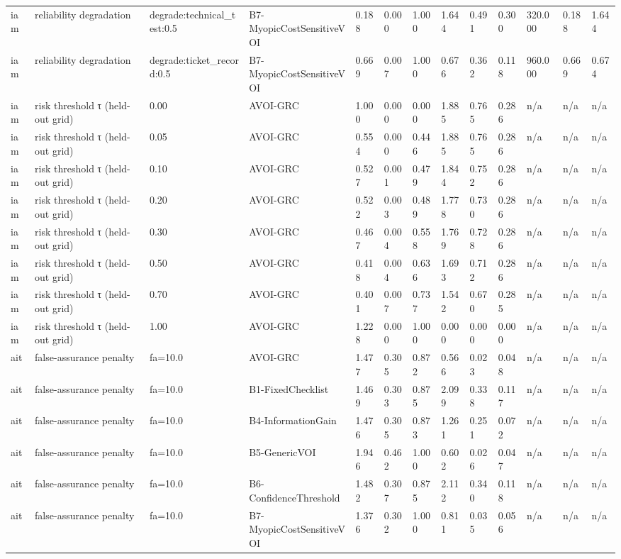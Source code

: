 \begin{table}[!ht]
{\begin{tabular}{lllllllllllll}
iam & reliability degradation & degrade:technical\_test:0.5 & B7-MyopicCostSensitiveVOI & 0.188 & 0.000 & 1.000 & 1.644 & 0.491 & 0.300 & 320.000 & 0.188 & 1.644 \\
iam & reliability degradation & degrade:ticket\_record:0.5 & B7-MyopicCostSensitiveVOI & 0.669 & 0.007 & 1.000 & 0.676 & 0.362 & 0.118 & 960.000 & 0.669 & 0.674 \\
iam & risk threshold τ (held-out grid) & 0.00 & AVOI-GRC & 1.000 & 0.000 & 0.000 & 1.885 & 0.765 & 0.286 & n/a & n/a & n/a \\
iam & risk threshold τ (held-out grid) & 0.05 & AVOI-GRC & 0.554 & 0.000 & 0.446 & 1.885 & 0.765 & 0.286 & n/a & n/a & n/a \\
iam & risk threshold τ (held-out grid) & 0.10 & AVOI-GRC & 0.527 & 0.001 & 0.479 & 1.844 & 0.752 & 0.286 & n/a & n/a & n/a \\
iam & risk threshold τ (held-out grid) & 0.20 & AVOI-GRC & 0.522 & 0.003 & 0.489 & 1.778 & 0.730 & 0.286 & n/a & n/a & n/a \\
iam & risk threshold τ (held-out grid) & 0.30 & AVOI-GRC & 0.467 & 0.004 & 0.558 & 1.769 & 0.728 & 0.286 & n/a & n/a & n/a \\
iam & risk threshold τ (held-out grid) & 0.50 & AVOI-GRC & 0.418 & 0.004 & 0.636 & 1.693 & 0.712 & 0.286 & n/a & n/a & n/a \\
iam & risk threshold τ (held-out grid) & 0.70 & AVOI-GRC & 0.401 & 0.007 & 0.737 & 1.542 & 0.670 & 0.285 & n/a & n/a & n/a \\
iam & risk threshold τ (held-out grid) & 1.00 & AVOI-GRC & 1.228 & 0.000 & 1.000 & 0.000 & 0.000 & 0.000 & n/a & n/a & n/a \\
ait & false-assurance penalty & fa=10.0 & AVOI-GRC & 1.477 & 0.305 & 0.872 & 0.566 & 0.023 & 0.048 & n/a & n/a & n/a \\
ait & false-assurance penalty & fa=10.0 & B1-FixedChecklist & 1.469 & 0.303 & 0.875 & 2.099 & 0.338 & 0.117 & n/a & n/a & n/a \\
ait & false-assurance penalty & fa=10.0 & B4-InformationGain & 1.476 & 0.305 & 0.873 & 1.261 & 0.251 & 0.072 & n/a & n/a & n/a \\
ait & false-assurance penalty & fa=10.0 & B5-GenericVOI & 1.946 & 0.462 & 1.000 & 0.602 & 0.026 & 0.047 & n/a & n/a & n/a \\
ait & false-assurance penalty & fa=10.0 & B6-ConfidenceThreshold & 1.482 & 0.307 & 0.875 & 2.112 & 0.340 & 0.118 & n/a & n/a & n/a \\
ait & false-assurance penalty & fa=10.0 & B7-MyopicCostSensitiveVOI & 1.376 & 0.302 & 1.000 & 0.811 & 0.035 & 0.056 & n/a & n/a & n/a \\

\end{tabular}}
\end{table}
